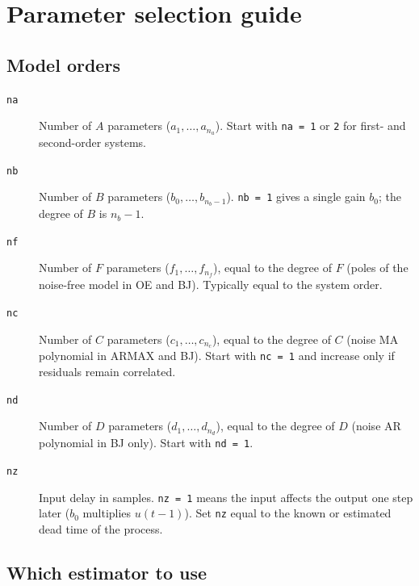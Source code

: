 \documentclass[11pt,a4paper]{article}
\begin{document}
\newpage
\section{Parameter selection guide}

\subsection{Model orders}

\begin{description}
  \item[\texttt{na}] Number of $A$ parameters ($a_1,\ldots,a_{n_a}$).
        Start with \texttt{na = 1} or \texttt{2} for first- and
        second-order systems.

  \item[\texttt{nb}] Number of $B$ parameters ($b_0, \ldots, b_{n_b-1}$).
        \texttt{nb = 1} gives a single gain $b_0$; the degree of $B$
        is $n_b - 1$.

  \item[\texttt{nf}] Number of $F$ parameters ($f_1,\ldots,f_{n_f}$),
        equal to the degree of $F$ (poles of the noise-free model in
        OE and BJ).  Typically equal to the system order.

  \item[\texttt{nc}] Number of $C$ parameters ($c_1,\ldots,c_{n_c}$),
        equal to the degree of $C$ (noise MA polynomial in ARMAX and
        BJ).  Start with \texttt{nc = 1} and increase only if
        residuals remain correlated.

  \item[\texttt{nd}] Number of $D$ parameters ($d_1,\ldots,d_{n_d}$),
        equal to the degree of $D$ (noise AR polynomial in BJ only).
        Start with \texttt{nd = 1}.

  \item[\texttt{nz}] Input delay in samples.  \texttt{nz = 1} means the
        input affects the output one step later ($b_0$ multiplies
        $u(t-1)$).  Set \texttt{nz} equal to the known or estimated
        dead time of the process.
\end{description}

\subsection{Which estimator to use}
\end{document}
